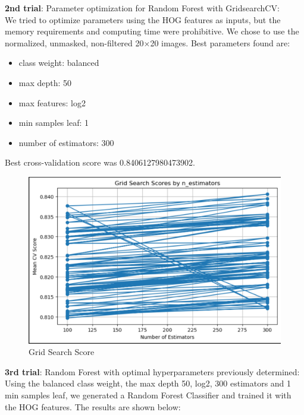 \documentclass{article}
\begin{document}
\textbf{2nd trial}: Parameter optimization for Random Forest with GridsearchCV:\\
We tried to optimize parameters using the HOG features as inputs, but the memory requirements and computing time were prohibitive. We chose to use the normalized, unmasked, non-filtered 20×20 images. 
Best parameters found are:
\begin{itemize}
    \item class weight: balanced
    \item max depth: 50
    \item max features: log2
    \item min samples leaf: 1
    \item number of estimators: 300
\end{itemize} 
Best cross-validation score was  0.8406127980473902.

\begin{figure}[H]
    \centering
    \includegraphics[width=0.8\linewidth]{GridSearchScore.png}
    \caption{Grid Search Score}
    \label{fig:GridSearchCV}
\end{figure}

\textbf{3rd trial}: Random Forest with optimal hyperparameters previously determined:\\
Using the balanced class weight, the max depth 50, log2, 300 estimators and 1 min samples leaf, we generated a Random Forest Classifier and trained it with the HOG features. The results are shown below: 
\end{document}
